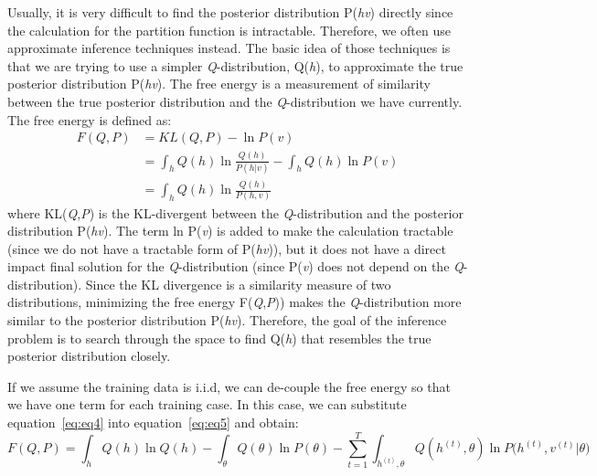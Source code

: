 \documentclass{article} %
\begin{document}
Usually, it is very difficult to find the posterior distribution P(\textit{h}\textbar\textit{v}) directly since the calculation for the partition function is intractable. Therefore, we often use approximate inference techniques instead. The basic idea of those techniques is that we are trying to use a simpler \textit{Q}-distribution, Q(\textit{h}), to approximate the true posterior distribution P(\textit{h}\textbar\textit{v}). The free energy is a measurement of similarity between the true posterior distribution and the \textit{Q}-distribution we have currently. The free energy is defined as:
\begin{equation} \label{eq:eq5}
\begin{split}
F(Q,P) &= KL(Q,P) - \ln P(v) \\
& = \int_{h} Q(h)\ln \frac{Q(h)}{P(h|v)} - \int_{h} Q(h)\ln P(v) \\
& = \int_{h} Q(h)\ln \frac{Q(h)}{P(h,v)} 
\end{split}
\end{equation}
where KL(\textit{Q},\textit{P}) is the KL-divergent between the \textit{Q}-distribution and the posterior distribution P(\textit{h}\textbar\textit{v}). The term ln P(\textit{v}) is added to make the calculation tractable (since we do not have a tractable form of P(\textit{h}\textbar\textit{v})), but it does not have a direct impact final solution for the \textit{Q}-distribution (since P(\textit{v}) does not depend on the \textit{Q}-distribution). Since the KL divergence is a similarity measure of two distributions, minimizing the free energy F(\textit{Q},\textit{P})) makes the \textit{Q}-distribution more similar to the posterior distribution P(\textit{h}\textbar\textit{v}). Therefore, the goal of the inference problem is to search through the space to find Q(\textit{h}) that resembles the true posterior distribution closely. 

If we assume the training data is i.i.d, we can de-couple the free energy so that we have one term for each training case. In this case, we can substitute equation~\ref{eq:eq4} into equation~\ref{eq:eq5} and obtain:
\begin{equation}
F(Q,P) = \int_{h} Q(h)\ln Q(h) - \int_{\theta} Q(\theta)\ln P(\theta) - \sum_{t=1}^T \int_{h^{(t)},\theta}Q(h^{(t)},\theta)\ln P\Big(h^{(t)}, v^{(t)}|\theta\Big) 
\label{eq:eq6}
\end{equation}
\end{document}
